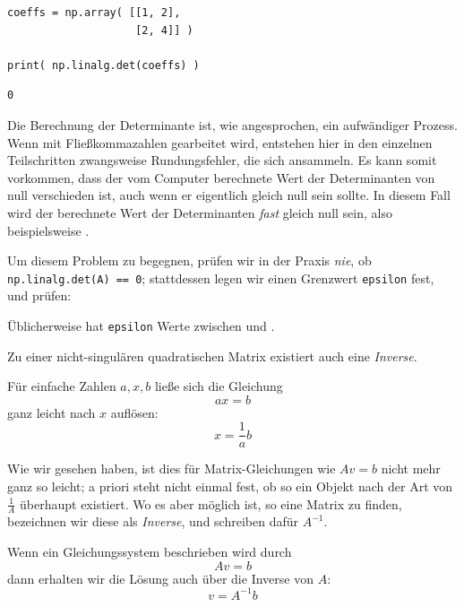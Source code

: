 \begin{codebox}
\begin{verbatim}
coeffs = np.array( [[1, 2],
                    [2, 4]] )

print( np.linalg.det(coeffs) )
\end{verbatim}
\end{codebox}
%
\begin{cmdbox}
\begin{verbatim}
0
\end{verbatim}
\end{cmdbox}

\begin{warnbox}
Die Berechnung der Determinante ist, wie angesprochen, ein aufwändiger Prozess. Wenn mit Fließkommazahlen gearbeitet wird, entstehen hier in den einzelnen Teilschritten zwangsweise Rundungsfehler, die sich ansammeln. Es kann somit vorkommen, dass der vom Computer berechnete Wert der Determinanten von null verschieden ist, auch wenn er eigentlich gleich null sein sollte. In diesem Fall wird der berechnete Wert der Determinanten \emph{fast} gleich null sein, also beispielsweise .

Um diesem Problem zu begegnen, prüfen wir in der Praxis \emph{nie}, ob \texttt{np.linalg.det(A) == 0}; stattdessen legen wir einen Grenzwert \texttt{epsilon} fest, und prüfen:
\begin{center}
\end{center}
Üblicherweise hat \texttt{epsilon} Werte zwischen  und .
\end{warnbox}

Zu einer nicht-singulären quadratischen Matrix existiert auch eine \emph{Inverse}.

\begin{hintbox}
Für einfache Zahlen $a, x, b$ ließe sich die Gleichung
\[ ax = b \]
ganz leicht nach $x$ auflösen:
\[ x = \frac{1}{a} b \]

Wie wir gesehen haben, ist dies für Matrix-Gleichungen wie $Av = b$ nicht mehr ganz so leicht; a priori steht nicht einmal fest, ob so ein Objekt nach der Art von 
$\frac{1}{A}$ überhaupt existiert. Wo es aber möglich ist, so eine Matrix zu finden, bezeichnen wir diese als \emph{Inverse}, und schreiben dafür $A^{-1}$.

Wenn ein Gleichungssystem beschrieben wird durch
\[ Av = b \]
dann erhalten wir die Lösung auch über die Inverse von $A$:
\[ v = A^{-1}b \]
\end{hintbox}

